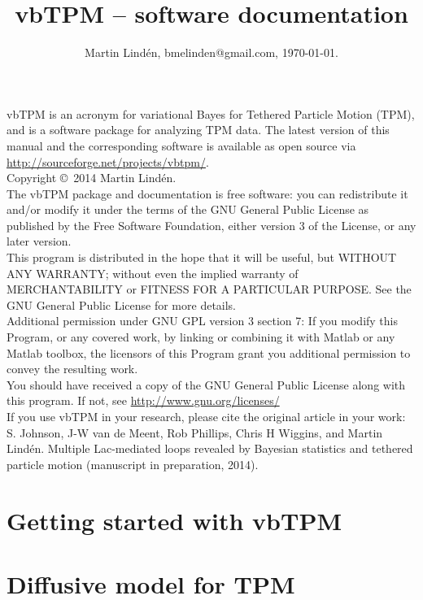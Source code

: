 \documentclass[11pt,letterpaper,twocolumn]{article}
\title{vbTPM -- software documentation}
\author{Martin Lind\'en, bmelinden@gmail.com, \today.}
\date{}
\begin{document}
\onecolumn
\maketitle 
\noindent 
vbTPM is an acronym for variational Bayes for Tethered Particle Motion
(TPM), and is a software package for analyzing TPM data.  The latest
version of this manual and the corresponding software is available as
open source via \url{http://sourceforge.net/projects/vbtpm/}. \bigskip\\
\noindent Copyright \copyright~2014 Martin Lindén. \smallskip\\
\noindent
The vbTPM package and documentation is free software: you can
redistribute it and/or modify it under the terms of the GNU General
Public License as published by the Free Software Foundation, either
version 3 of the License, or any later version.\smallskip\\
\noindent
This program is distributed in the hope that it will be useful, but
WITHOUT ANY WARRANTY; without even the implied warranty of
MERCHANTABILITY or FITNESS FOR A PARTICULAR PURPOSE. See the GNU
General Public License for more details.\smallskip\\
\noindent
Additional permission under GNU GPL version 3 section 7: If you modify
this Program, or any covered work, by linking or combining it with
Matlab or any Matlab toolbox, the licensors of this Program grant you
additional permission to convey the resulting work.\smallskip\\
\noindent 
You should have received a copy of the GNU General Public License
along with this program. If not, see \url{http://www.gnu.org/licenses/}
\bigskip\\
\noindent 
If you use vbTPM in your research, please cite the original article in
your work:
\medskip\\
\noindent 
S. Johnson, J-W van de Meent, Rob Phillips, Chris H Wiggins, and
Martin Lindén. Multiple Lac-mediated loops revealed by Bayesian
statistics and tethered particle motion (manuscript in preparation,
2014).


\twocolumn
\tableofcontents
\clearpage
\section{Getting started with vbTPM}

\section{Diffusive model for TPM}

\end{document}
